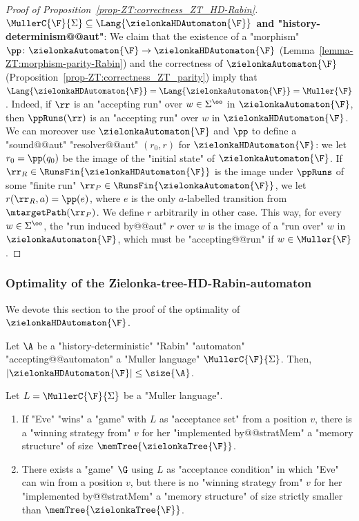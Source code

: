 \documentclass[10pt,a4paper]{amsart}
\renewcommand{\SS}{\Sigma}
\begin{document}
\begin{proof}[Proof of Proposition~\ref{prop-ZT:correctness_ZT_HD-Rabin}]
	\textbf{$\MullerC{\F}{\SS} \subseteq \Lang{\zielonkaHDAutomaton{\F}}$ and "history-determinism@@aut"}:	
	We claim that the existence of a "morphism" $\pp\colon \zielonkaAutomaton{\F} \to \zielonkaHDAutomaton{\F}$ (Lemma~\ref{lemma-ZT:morphism-parity-Rabin}) and the correctness of $\zielonkaAutomaton{\F}$ (Proposition~\ref{prop-ZT:correctness_ZT_parity}) imply that $\Lang{\zielonkaHDAutomaton{\F}} = \Lang{\zielonkaAutomaton{\F}} = \Muller{\F}$. Indeed, if $\rr$ is an "accepting run" over $w\in \SS^\oo$ in $\zielonkaAutomaton{\F}$, then $\ppRuns(\rr)$  is an "accepting run" over $w$ in $\zielonkaHDAutomaton{\F}$.
	We can moreover use $\zielonkaAutomaton{\F}$ and $\pp$ to define a "sound@@aut" "resolver@@aut" $(r_0,r)$ for $\zielonkaHDAutomaton{\F}$: we let $r_0 = \pp(q_0)$ be the image of the "initial state" of $\zielonkaAutomaton{\F}$. If $\rr_R\in \RunsFin{\zielonkaHDAutomaton{\F}}$ is the image under $\ppRuns$ of some "finite run" $\rr_P\in \RunsFin{\zielonkaAutomaton{\F}}$, we let $r(\rr_R, a) = \pp(e)$, where $e$ is the only $a$-labelled transition from $\mtargetPath(\rr_P)$. We define $r$ arbitrarily in other case. This way, for every $w\in \SS^\oo$, the "run induced by@@aut" $r$ over $w$ is the image of a "run over" $w$ in $\zielonkaAutomaton{\F}$, which must be "accepting@@run" if $w\in \Muller{\F}$.
\end{proof}

\subsubsection{Optimality of the Zielonka-tree-HD-Rabin-automaton}\label{subsubsec-zt-HD: optimality}

We devote this section to the proof of the optimality of $\zielonkaHDAutomaton{\F}$.


\begin{theorem}\label{thm-zt:optimality_ZT-HD-Rabin}
	Let $\A$ be a "history-deterministic" "Rabin" "automaton" "accepting@@automaton" a "Muller language" $\MullerC{\F}{\SS}$. Then, $ |\zielonkaHDAutomaton{\F}|\leq \size{\A}$.
\end{theorem}



\begin{proposition}\label{prop-ZT:mem-ZT-DJW}
	Let $L = \MullerC{\F}{\SS}$ be a "Muller language". 
	\begin{enumerate}
		\item If "Eve" "wins" a "game" with $L$ as "acceptance set" from a position $v$, there is a "winning strategy from" $v$ for her "implemented by@@stratMem" a "memory structure" of size $\memTree{\zielonkaTree{\F}}$.
		\item There exists a "game" $\G$ using $L$ as "acceptance condition" in which "Eve" can win from a position $v$, but there is no "winning strategy from" $v$ for her "implemented by@@stratMem" a "memory structure" of size strictly smaller than $\memTree{\zielonkaTree{\F}}$.
	\end{enumerate}
\end{proposition}
\end{document}
